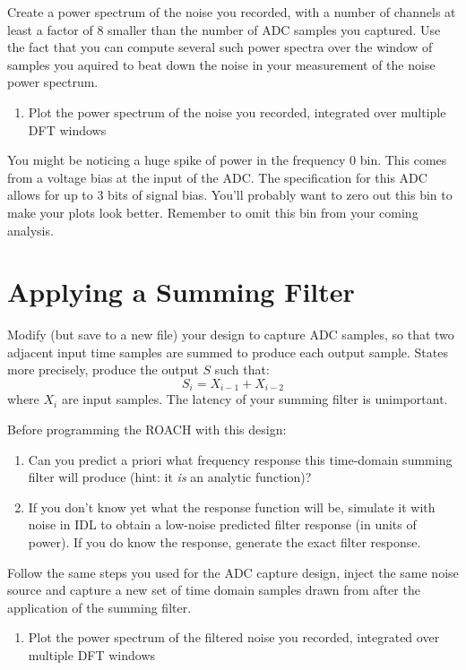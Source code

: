 \documentclass[11pt]{article}
\begin{document}
Create a power spectrum of the noise you recorded, with a number of channels at least a factor of 8 smaller than
the number of ADC samples you captured.  Use the fact that you can compute several such power spectra over the 
window of samples you aquired to beat down the noise in your measurement of the noise power spectrum. 
\begin{enumerate}
\item Plot the power spectrum of the noise you recorded, integrated over multiple DFT windows
\end{enumerate}
You might be noticing a huge spike of power in the frequency 0 bin.  This comes from a voltage bias at the input
of the ADC.  The specification for this ADC allows for up to 3 bits of signal bias.  You'll probably want to 
zero out this bin to make your plots look better. Remember to omit this bin from your coming analysis.

\section{Applying a Summing Filter}

Modify (but save to a new file) your design to capture ADC samples, so that two adjacent input time samples are summed
to produce each output sample.  States more precisely, produce the output $S$ such that:
\begin{equation}
S_i = X_{i-1} + X_{i-2}
\end{equation}
where $X_i$ are input samples.  The latency of your summing filter is unimportant.

Before programming the ROACH with this design:
\begin{enumerate}
\item Can you predict a priori what frequency response this time-domain 
summing filter will produce (hint: it {\it is} an analytic function)?
\item If you don't know yet what the response function will be, simulate it with noise in IDL 
to obtain a low-noise predicted filter response (in units of power).  If you do know the response, 
generate the exact filter response.
\end{enumerate}

Follow the same steps you used for the ADC capture design, inject the same noise source and
capture a new set of time domain samples drawn from after the application of the summing filter.
\begin{enumerate}
\item Plot the power spectrum of the filtered noise you recorded, integrated over multiple DFT windows
\end{enumerate}
\end{document}
